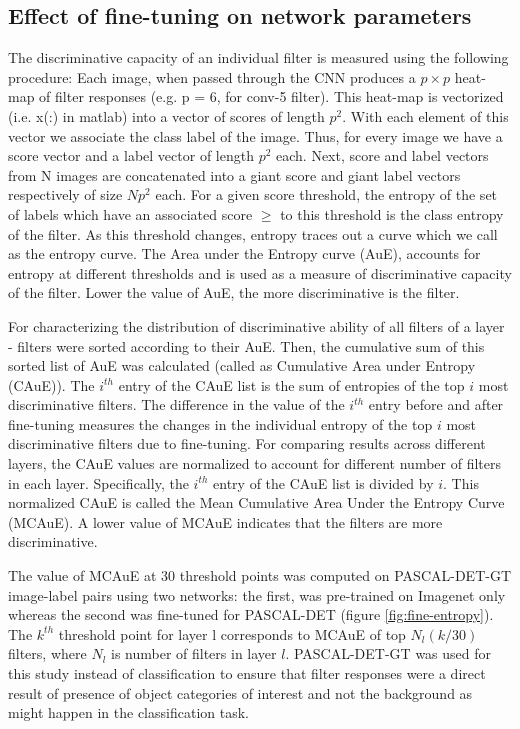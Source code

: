 \subsection{Effect of fine-tuning on network parameters}
\label{sub:fine-entropy}
The discriminative capacity of an individual filter is measured using the following procedure: Each image, when passed through the CNN produces a $p \times p$ heat-map of filter responses (e.g. p = 6, for conv-5 filter). This heat-map is vectorized (i.e. x(:) in matlab) into a vector of scores of length $p^2$. With each element of this vector we associate the class label of the image. Thus, for every image we have a score vector and a label vector of length $p^2$ each. Next, score and label vectors from N images are concatenated into a giant score and giant label vectors respectively of size $Np^2$ each. For a given score threshold, the entropy of the set of labels which have an associated score $\geq$ to this threshold is the class entropy of the filter. As this threshold changes, entropy traces out a curve which we call as the entropy curve. The Area under the Entropy curve (AuE), accounts for entropy at different thresholds and is used as a measure of discriminative capacity of the filter. Lower the value of AuE, the more discriminative is the filter. 

For characterizing the distribution of discriminative ability of all filters of a layer - filters were sorted according to their AuE. Then, the cumulative sum of this sorted list of AuE was calculated (called as Cumulative Area under Entropy (CAuE)). The $i^{th}$ entry of the CAuE list is the sum of entropies of the top $i$ most discriminative filters. The difference in the value of the $i^{th}$ entry before and after fine-tuning measures the changes in the individual entropy of the top $i$ most discriminative filters due to fine-tuning. For comparing results across different layers, the CAuE values are normalized to account for different number of filters in each layer. Specifically, the $i^{th}$ entry of the CAuE list is divided by $i$. This normalized CAuE is called the Mean Cumulative Area Under the Entropy Curve (MCAuE). A lower value of MCAuE indicates that the filters are more discriminative.

The value of MCAuE at 30 threshold points was computed on PASCAL-DET-GT image-label pairs using two networks: the first, was pre-trained on Imagenet only whereas the second was fine-tuned for PASCAL-DET (figure \ref{fig:fine-entropy}). The  $k^{th}$ threshold point for layer l corresponds to MCAuE of top $N_l(k/30)$ filters, where $N_l$ is number of filters in layer $l$. PASCAL-DET-GT was used for this study instead of classification to ensure that filter responses were a direct result of presence of object categories of interest and not the background as might happen in the classification task.

